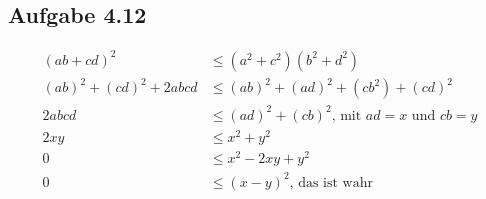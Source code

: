 \documentclass{standalone}
\begin{document}
\subsection{Aufgabe 4.12}
\begin{align}
    (ab + cd)^2 &\leq (a^2 + c^2)(b^2 + d^2) \\
    (ab)^2 + (cd)^2 + 2abcd &\leq (ab)^2 + (ad)^2 + (cb^2) + (cd)^2 \\
    2abcd &\leq (ad)^2 + (cb)^2 \text{, mit } ad = x \text{ und } cb = y\\
    2xy &\leq x^2 + y^2 \\
    0 &\leq x^2-2xy+y^2 \\
    0 &\leq (x-y)^2 \text{, das ist wahr}
\end{align}
\end{document}
